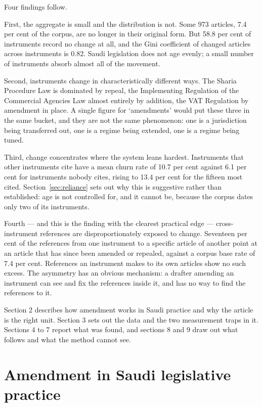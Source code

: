 \documentclass[11pt]{article}
\begin{document}
Four findings follow.

First, the aggregate is small and the distribution is not. Some 973 articles,
7.4 per cent of the corpus, are no longer in their original form. But 58.8 per
cent of instruments record no change at all, and the Gini coefficient of
changed articles across instruments is 0.82. Saudi legislation does not age
evenly; a small number of instruments absorb almost all of the movement.

Second, instruments change in characteristically different ways. The Sharia
Procedure Law is dominated by repeal, the Implementing Regulation of the
Commercial Agencies Law almost entirely by addition, the VAT Regulation by
amendment in place. A single figure for `amendments' would put these three
in the same bucket, and they are not the same phenomenon: one is a
jurisdiction being transferred out, one is a regime being extended, one is a
regime being tuned.

Third, change concentrates where the system leans hardest. Instruments that
other instruments cite have a mean churn rate of 10.7 per cent against 6.1
per cent for instruments nobody cites, rising to 13.4 per cent for the fifteen
most cited. Section~\ref{sec:reliance} sets out why this is suggestive rather
than established: age is not controlled for, and it cannot be, because the
corpus dates only two of its instruments.

Fourth --- and this is the finding with the clearest practical edge ---
cross-instrument references are disproportionately exposed to change.
Seventeen per cent of the references from one instrument to a specific article
of another point at an article that has since been amended or repealed,
against a corpus base rate of 7.4 per cent. References an instrument makes to
its own articles show no such excess. The asymmetry has an obvious mechanism:
a drafter amending an instrument can see and fix the references inside it,
and has no way to find the references to it.

Section 2 describes how amendment works in Saudi practice and why the article
is the right unit. Section 3 sets out the data and the two measurement traps
in it. Sections 4 to 7 report what was found, and sections 8 and 9 draw out
what follows and what the method cannot see.

\section{Amendment in Saudi legislative practice}
\end{document}
